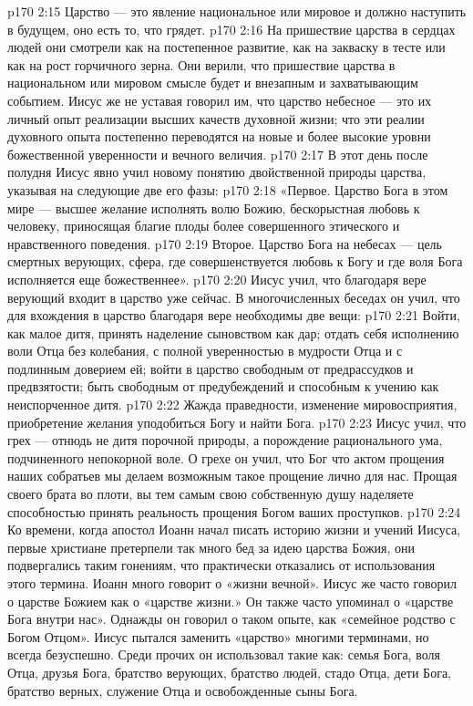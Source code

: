 \vs p170 2:15 \bibnobreakspace Царство --- это явление национальное или мировое и должно наступить в будущем, оно есть то, что грядет.
\vs p170 2:16 \pc На пришествие царства в сердцах людей они смотрели как на постепенное развитие, как на закваску в тесте или как на рост горчичного зерна. Они верили, что пришествие царства в национальном или мировом смысле будет и внезапным и захватывающим событием. Иисус же не уставая говорил им, что царство небесное --- это их личный опыт реализации высших качеств духовной жизни; что эти реалии духовного опыта постепенно переводятся на новые и более высокие уровни божественной уверенности и вечного величия.
\vs p170 2:17 В этот день после полудня Иисус явно учил новому понятию двойственной природы царства, указывая на следующие две его фазы:
\vs p170 2:18 «Первое. Царство Бога в этом мире --- высшее желание исполнять волю Божию, бескорыстная любовь к человеку, приносящая благие плоды более совершенного этического и нравственного поведения.
\vs p170 2:19 Второе. Царство Бога на небесах --- цель смертных верующих, сфера, где совершенствуется любовь к Богу и где воля Бога исполняется еще божественнее».
\vs p170 2:20 Иисус учил, что благодаря вере верующий входит в царство уже сейчас. В многочисленных беседах он учил, что для вхождения в царство благодаря вере необходимы две вещи:
\vs p170 2:21 \pc {}\bibnobreakspace {} Войти, как малое дитя, принять наделение сыновством как дар; отдать себя исполнению воли Отца без колебания, с полной уверенностью в мудрости Отца и с подлинным доверием ей; войти в царство свободным от предрассудков и предвзятости; быть свободным от предубеждений и способным к учению как неиспорченное дитя.
\vs p170 2:22 \pc {}\bibnobreakspace {} Жажда праведности, изменение мировосприятия, приобретение желания уподобиться Богу и найти Бога.
\vs p170 2:23 Иисус учил, что грех --- отнюдь не дитя порочной природы, а порождение рационального ума, подчиненного непокорной воле. О грехе он учил, что Бог  что актом прощения наших собратьев мы делаем возможным такое прощение лично для нас. Прощая своего брата во плоти, вы тем самым свою собственную душу наделяете способностью принять реальность прощения Богом ваших проступков.
\vs p170 2:24 Ко времени, когда апостол Иоанн начал писать историю жизни и учений Иисуса, первые христиане претерпели так много бед за идею царства Божия, они подвергались таким гонениям, что практически отказались от использования этого термина. Иоанн много говорит о «жизни вечной». Иисус же часто говорил о царстве Божием как о «царстве жизни.» Он также часто упоминал о «царстве Бога внутри нас». Однажды он говорил о таком опыте, как «семейное родство с Богом Отцом». Иисус пытался заменить «царство» многими терминами, но всегда безуспешно. Среди прочих он использовал такие как: семья Бога, воля Отца, друзья Бога, братство верующих, братство людей, стадо Отца, дети Бога, братство верных, служение Отца и освобожденные сыны Бога.
